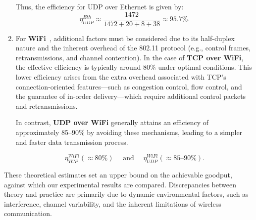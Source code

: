 \begin{enumerate}
                \noindent Thus, the efficiency for UDP over Ethernet is given by:
                \[
                \eta_{UDP}^{Eth} \approx \frac{1472}{1472 + 20 + 8 + 38} \approx 95.7\%.
                \]


            \item  
                For \textbf{WiFi}~\cite{ieee80211ax}, additional factors must be considered due to its half-duplex nature and the inherent overhead of the 802.11 protocol (e.g., control frames, retransmissions, and channel contention). 
                In the case of \textbf{TCP over WiFi}, the effective efficiency is typically around 80\% under optimal conditions. 
                This lower efficiency arises from the extra overhead associated with TCP’s connection-oriented features—such as congestion control, 
                flow control, and the guarantee of in-order delivery—which require additional control packets and retransmissions. 
                
                In contrast, \textbf{UDP over WiFi} generally attains an efficiency of approximately 85–90\% by avoiding these mechanisms, 
                leading to a simpler and faster data transmission process.
        
                \[
                    \eta_{TCP}^{WiFi} (\approx 80\%) \hspace{1em} \text{ and } \hspace{1em} \eta_{UDP}^{WiFi} (\approx 85\text{–}90\%).
                \]
            
        \end{enumerate}

        \noindent These theoretical estimates set an upper bound on the achievable goodput, against which our experimental results are compared. 
        Discrepancies between theory and practice are primarily due to dynamic environmental factors, such as interference, channel variability, and the inherent limitations of wireless communication.
